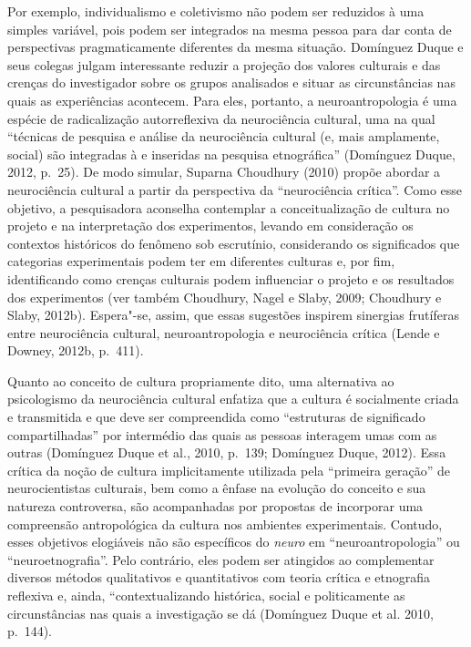 Por exemplo, individualismo e coletivismo não podem ser reduzidos à uma
simples variável, pois podem ser integrados na mesma pessoa para dar
conta de perspectivas pragmaticamente diferentes da mesma situação.
Domínguez Duque e seus colegas julgam interessante reduzir a projeção
dos valores culturais e das crenças do investigador sobre os grupos
analisados e situar as circunstâncias nas quais as experiências
acontecem. Para eles, portanto, a neuroantropologia é uma espécie de
radicalização autorreflexiva da neurociência cultural, uma na qual
``técnicas de pesquisa e análise da neurociência cultural (e, mais
amplamente, social) são integradas à e inseridas na pesquisa
etnográfica'' (Domínguez Duque, 2012, p.~25). De modo simular, Suparna
Choudhury (2010) propõe abordar a neurociência cultural a partir da
perspectiva da ``neurociência crítica''. Como esse objetivo, a
pesquisadora aconselha contemplar a conceitualização de cultura no
projeto e na interpretação dos experimentos, levando em consideração os
contextos históricos do fenômeno sob escrutínio, considerando os
significados que categorias experimentais podem ter em diferentes
culturas e, por fim, identificando como crenças culturais podem
influenciar o projeto e os resultados dos experimentos (ver também
Choudhury, Nagel e Slaby, 2009; Choudhury e Slaby, 2012b). Espera"-se,
assim, que essas sugestões inspirem sinergias frutíferas entre
neurociência cultural, neuroantropologia e neurociência crítica (Lende e
Downey, 2012b, p.~411).

Quanto ao conceito de cultura propriamente dito, uma alternativa ao
psicologismo da neurociência cultural enfatiza que a cultura é
socialmente criada e transmitida e que deve ser compreendida como
``estruturas de significado compartilhadas'' por intermédio das quais as
pessoas interagem umas com as outras (Domínguez Duque et al., 2010,
p.~139; Domínguez Duque, 2012). Essa crítica da noção de cultura
implicitamente utilizada pela ``primeira geração'' de neurocientistas
culturais, bem como a ênfase na evolução do conceito e sua natureza
controversa, são acompanhadas por propostas de incorporar uma
compreensão antropológica da cultura nos ambientes experimentais.
Contudo, esses objetivos elogiáveis não são específicos do \emph{neuro}
em ``neuroantropologia'' ou ``neuroetnografia''. Pelo contrário, eles
podem ser atingidos ao complementar diversos métodos qualitativos e
quantitativos com teoria crítica e etnografia reflexiva e, ainda,
``contextualizando histórica, social e politicamente as circunstâncias
nas quais a investigação se dá (Domínguez Duque et al. 2010, p.~144).

